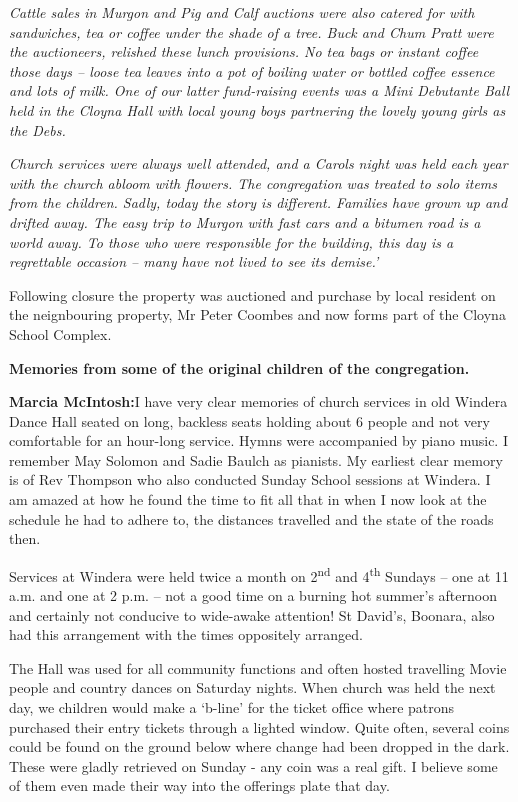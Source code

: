 \emph{Cattle sales in Murgon and Pig and Calf auctions were also catered for with sandwiches, tea or coffee under the shade of a tree. Buck and Chum Pratt were the auctioneers, relished these lunch provisions. No tea bags or instant coffee those days -- loose tea leaves into a pot of boiling water or bottled coffee essence and lots of milk. One of our latter fund-raising events was a Mini Debutante Ball held in the Cloyna Hall with local young boys partnering the lovely young girls as the Debs.}



\emph{Church services were always well attended, and a Carols night was held each year with the church abloom with flowers. The congregation was treated to solo items from the children. Sadly, today the story is different. Families have grown up and drifted away. The easy trip to Murgon with fast cars and a bitumen road is a world away. To those who were responsible for the building, this day is a regrettable occasion -- many have not lived to see its demise.'}



Following closure the property was auctioned and purchase by local resident on the neignbouring property, Mr Peter Coombes and now forms part of the Cloyna School Complex.



\textbf{Memories from some of the original children of the congregation.}



\textbf{Marcia McIntosh:}I have very clear memories of church services in old Windera Dance Hall seated on long, backless seats holding about 6 people and not very comfortable for an hour-long service. Hymns were accompanied by piano music. I remember May Solomon and Sadie Baulch as pianists. My earliest clear memory is of Rev Thompson who also conducted Sunday School sessions at Windera. I am amazed at how he found the time to fit all that in when I now look at the schedule he had to adhere to, the distances travelled and the state of the roads then.



Services at Windera were held twice a month on 2\textsuperscript{nd} and 4\textsuperscript{th} Sundays -- one at 11 a.m. and one at 2 p.m. -- not a good time on a burning hot summer's afternoon and certainly not conducive to wide-awake attention! St David's, Boonara, also had this arrangement with the times oppositely arranged.



The Hall was used for all community functions and often hosted travelling Movie people and country dances on Saturday nights. When church was held the next day, we children would make a `b-line' for the ticket office where patrons purchased their entry tickets through a lighted window. Quite often, several coins could be found on the ground below where change had been dropped in the dark. These were gladly retrieved on Sunday - any coin was a real gift. I believe some of them even made their way into the offerings plate that day.



